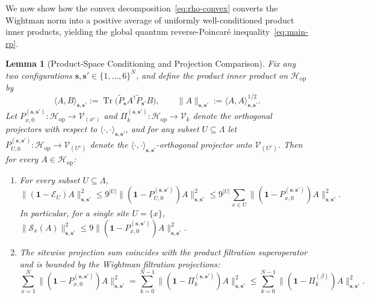 \documentclass[11pt,a4paper]{article}
\numberwithin{equation}{section}
\theoremstyle{plain}
\newtheorem{lemma}[theorem]{Lemma}
\theoremstyle{definition}
\newcommand{\Hop}{\mathcal{H}_{\mathrm{op}}}
\newcommand{\Tr}{\operatorname{Tr}}
\begin{document}
We now show how the convex decomposition~\eqref{eq:rho-convex} converts the Wightman norm into a positive average of uniformly well-conditioned product inner products, yielding the global quantum reverse-Poincar\'e inequality~\eqref{eq:main-rp}.

\begin{lemma}[Product-Space Conditioning and Projection Comparison]\label{lem:prod-comp}
Fix any two configurations $\mathbf{s},\mathbf{s}'\in\{1,\dots,6\}^N$, and define the product inner product on $\Hop$ by
\begin{equation}\label{eq:ss-inner}
  \langle A, B\rangle_{\mathbf{s},\mathbf{s}'} := \Tr\bigl(\widetilde{P}_{\mathbf{s}} A^\dagger \widetilde{P}_{\mathbf{s}'} B\bigr),
  \qquad \|A\|_{\mathbf{s},\mathbf{s}'} := \langle A, A\rangle_{\mathbf{s},\mathbf{s}'}^{1/2}.
\end{equation}
Let $P_{x,0}^{(\mathbf{s},\mathbf{s}')}:\Hop\to\mathcal{V}_{(x^c)}$ and $\Pi_k^{(\mathbf{s},\mathbf{s}')}:\Hop\to\mathcal{V}_k$ denote the orthogonal projectors with respect to $\langle\cdot,\cdot\rangle_{\mathbf{s},\mathbf{s}'}$, and for any subset $U\subseteq\Lambda$ let $P_{U,0}^{(\mathbf{s},\mathbf{s}')}:\Hop\to\mathcal{V}_{(U^c)}$ denote the $\langle\cdot,\cdot\rangle_{\mathbf{s},\mathbf{s}'}$-orthogonal projector onto $\mathcal{V}_{(U^c)}$. Then for every $A\in\Hop$:
\begin{enumerate}
  \setlength{\itemsep}{2pt}\setlength{\parskip}{0pt}
  \item[\emph{(1)}] For every subset $U\subseteq\Lambda$,
  \begin{equation}\label{eq:U-cond}
    \bigl\|(\mathbf{1}-\mathcal{E}_U)A\bigr\|_{\mathbf{s},\mathbf{s}'}^2
    \le 9^{|U|}\bigl\|(\mathbf{1}-P_{U,0}^{(\mathbf{s},\mathbf{s}')})A\bigr\|_{\mathbf{s},\mathbf{s}'}^2
    \le 9^{|U|}\sum_{x\in U}\bigl\|(\mathbf{1}-P_{x,0}^{(\mathbf{s},\mathbf{s}')})A\bigr\|_{\mathbf{s},\mathbf{s}'}^2.
  \end{equation}
  In particular, for a single site $U=\{x\}$, $\|\mathcal{S}_x(A)\|_{\mathbf{s},\mathbf{s}'}^2 \le 9\|(\mathbf{1}-P_{x,0}^{(\mathbf{s},\mathbf{s}')})A\|_{\mathbf{s},\mathbf{s}'}^2$.
  \item[\emph{(2)}] The sitewise projection sum coincides with the product filtration superoperator and is bounded by the Wightman filtration projections:
  \begin{equation}\label{eq:prod-filt}
    \sum_{x=1}^N \bigl\|(\mathbf{1}-P_{x,0}^{(\mathbf{s},\mathbf{s}')})A\bigr\|_{\mathbf{s},\mathbf{s}'}^2
    = \sum_{k=0}^{N-1}\bigl\|(\mathbf{1}-\Pi_k^{(\mathbf{s},\mathbf{s}')})A\bigr\|_{\mathbf{s},\mathbf{s}'}^2
    \le \sum_{k=0}^{N-1}\bigl\|(\mathbf{1}-\Pi_k^{(\beta)})A\bigr\|_{\mathbf{s},\mathbf{s}'}^2.
  \end{equation}
\end{enumerate}
\end{lemma}
\end{document}
